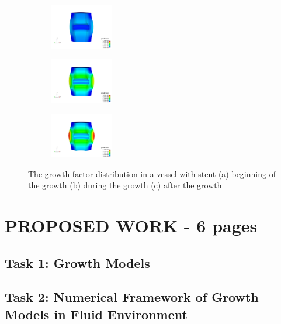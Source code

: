 \documentclass[12pt]{article}
\begin{document}
\begin{figure}[H]
	\centering
	\begin{subfigure}
		\centering
		\includegraphics[width=0.3\textwidth]{./figs/step1.jpg}
		\label{fig:step1}
	\end{subfigure}
	\begin{subfigure}
		\centering
		\includegraphics[width=0.3\textwidth]{./figs/step5.jpg}
		\label{fig:step5}
	\end{subfigure}
	\begin{subfigure}
		\centering
		\includegraphics[width=0.3\textwidth]{./figs/step15.jpg}
		\label{fig:step15}
	\end{subfigure}
	\caption{The growth factor distribution in a vessel with stent (a) beginning of the growth (b) during the growth (c) after the growth}
	\label{fig:growth_stent}
\end{figure}

\section{PROPOSED WORK - 6 pages}

\subsection{Task 1: Growth Models}


\subsection{Task 2: Numerical Framework of Growth Models in Fluid Environment}

\end{document}
